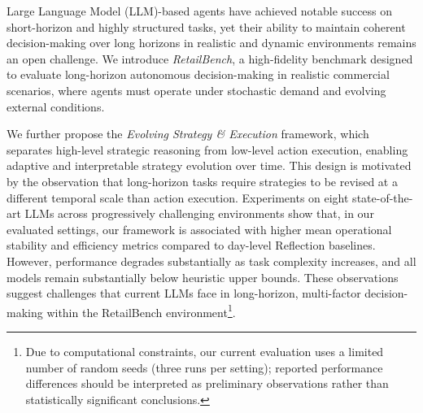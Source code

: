 Large Language Model (LLM)-based agents have achieved notable success on short-horizon and highly structured tasks, yet their ability to maintain coherent decision-making over long horizons in realistic and dynamic environments remains an open challenge. We introduce \textit{RetailBench}, a high-fidelity benchmark designed to evaluate long-horizon autonomous decision-making in realistic commercial scenarios, where agents must operate under stochastic demand and evolving external conditions.

We further propose the \textit{Evolving Strategy \& Execution} framework, which separates high-level strategic reasoning from low-level action execution, enabling adaptive and interpretable strategy evolution over time. This design is motivated by the observation that long-horizon tasks require strategies to be revised at a different temporal scale than action execution. Experiments on eight state-of-the-art LLMs across progressively challenging environments show that, in our evaluated settings, our framework is associated with higher mean operational stability and efficiency metrics compared to day-level Reflection baselines. However, performance degrades substantially as task complexity increases, and all models remain substantially below heuristic upper bounds. These observations suggest challenges that current LLMs face in long-horizon, multi-factor decision-making within the RetailBench environment\footnote{Due to computational constraints, our current evaluation uses a limited number of random seeds (three runs per setting); reported performance differences should be interpreted as preliminary observations rather than statistically significant conclusions.}.
